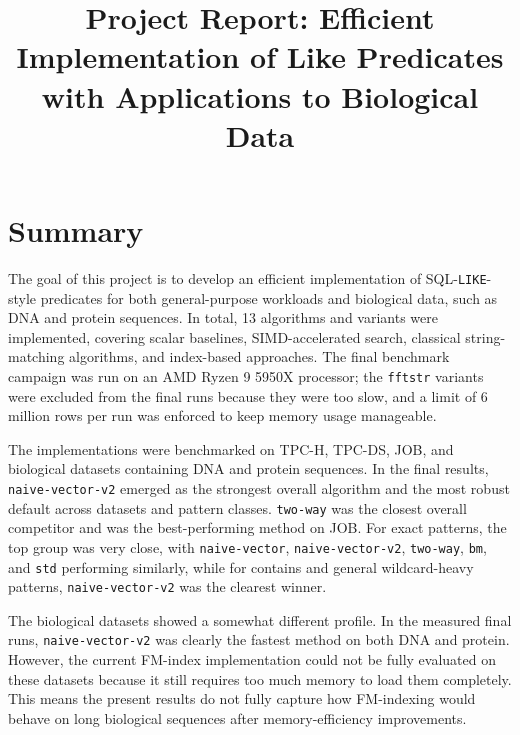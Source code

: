 \documentclass[11pt]{article}
\title{Project Report: Efficient Implementation of Like Predicates with Applications to Biological Data}
\author{}
\date{}
\begin{document}
\maketitle

\section{Summary}
The goal of this project is to develop an efficient implementation of SQL-\texttt{LIKE}-style predicates for both general-purpose workloads and biological data, such as DNA and protein sequences. In total, 13 algorithms and variants were implemented, covering scalar baselines, SIMD-accelerated search, classical string-matching algorithms, and index-based approaches. The final benchmark campaign was run on an AMD Ryzen 9 5950X processor; the \texttt{fftstr} variants were excluded from the final runs because they were too slow, and a limit of 6 million rows per run was enforced to keep memory usage manageable.

The implementations were benchmarked on TPC-H, TPC-DS, JOB, and biological datasets containing DNA and protein sequences. In the final results, \texttt{naive-vector-v2} emerged as the strongest overall algorithm and the most robust default across datasets and pattern classes. \texttt{two-way} was the closest overall competitor and was the best-performing method on JOB. For exact patterns, the top group was very close, with \texttt{naive-vector}, \texttt{naive-vector-v2}, \texttt{two-way}, \texttt{bm}, and \texttt{std} performing similarly, while for contains and general wildcard-heavy patterns, \texttt{naive-vector-v2} was the clearest winner.

The biological datasets showed a somewhat different profile. In the measured final runs, \texttt{naive-vector-v2} was clearly the fastest method on both DNA and protein. However, the current FM-index implementation could not be fully evaluated on these datasets because it still requires too much memory to load them completely. This means the present results do not fully capture how FM-indexing would behave on long biological sequences after memory-efficiency improvements.
\end{document}
